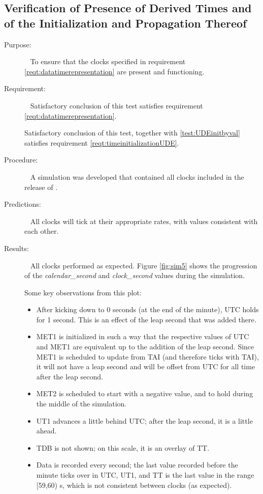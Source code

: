 \subsection{Verification of Presence of Derived Times and of the Initialization and Propagation Thereof}
  \label{test:clockpresence}
\begin{description}
\item[Purpose:]\ \newline
To ensure that the clocks specified in requirement \ref{reqt:datatimerepresentation} are present and functioning.

\item[Requirement:]\ \newline
Satisfactory conclusion of this test satisfies requirement \ref{reqt:datatimerepresentation}.

Satisfactory conclusion of this test, together with \ref{test:UDEinitbyval} satisfies requirement \ref{reqt:timeinitializationUDE}.


\item[Procedure:]\ \newline
A simulation was developed that contained all clocks included in the release of \JEODid.

\item[Predictions:]\ \newline
All clocks will tick at their appropriate rates, with values consistent with each other.

\item[Results:]\ \newline
All clocks performed as expected.  Figure \ref{fig:sim5} shows the progression of the \textit{calendar\_second} and \textit{clock\_second} values during the simulation.

Some key observations from this plot:
\begin{itemize}
	\item After kicking down to 0 seconds (at the end of the minute), UTC holds for 1 second.  This is an effect of the leap second that was added there.
	\item MET1 is initialized in such a way that the respective values of UTC and MET1 are equivalent up to the addition of the leap second.  Since MET1 is scheduled to update from TAI (and therefore ticks with TAI), it will not have a leap second and will be offset from UTC for all time after the leap second.
	\item MET2 is scheduled to start with a negative value, and to hold during the middle of the simulation.
	\item UT1 advances a little behind UTC; after the leap second, it is a little ahead.
	\item TDB is not shown; on this scale, it is an overlay of TT.
	\item Data is recorded every second; the last value recorded before the minute ticks over in UTC, UT1, and TT  is the last value in the range [59,60) s, which is not consistent between clocks (as expected).


\end{itemize}
\end{description}
